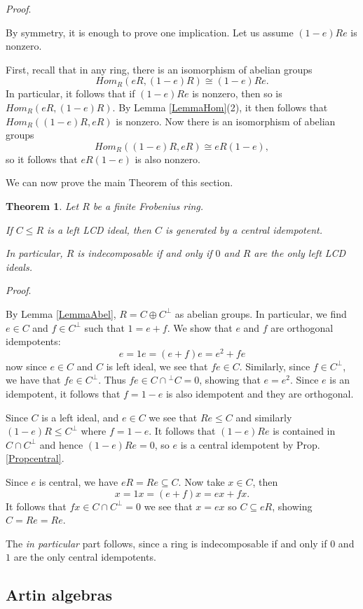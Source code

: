 \documentclass{article}
\theoremstyle{plain}
\newtheorem{Thm}[veta]{Theorem}
\theoremstyle{plain}
\theoremstyle{remark}
\theoremstyle{plain}
\newenvironment{dukaz}{
  \par\medskip \noindent
  \textit{Proof}.
}{

\rightline{$\qedsymbol$}
}
\begin{document}
\begin{dukaz}
    By symmetry, it is enough to prove one implication. Let us assume $(1-e)Re$ is nonzero.
    
    First, recall that in any ring,  there is an isomorphism of abelian groups   \[Hom_R(eR, (1-e)R)\cong (1-e)Re.\]
    In particular, it follows that if $(1-e)Re$ is nonzero, then so is $Hom_R(eR, (1-e)R)$. By Lemma \ref{LemmaHom}(2), it then follows that $Hom_R((1-e)R, eR)$ is nonzero. Now there is an isomorphism of abelian groups 
\[Hom_R((1-e)R, eR)\cong eR(1-e),\]
so it follows that $eR(1-e)$ is also nonzero. 
\end{dukaz}
We can now prove the main Theorem of this section.
\begin{Thm}\label{ThmLCDmain}
    Let $R$ be a finite Frobenius ring.

    If $C\leq R$ is a left LCD ideal, then $C$ is generated by a central idempotent.

 In particular,  $R$ is indecomposable if and only if $0$ and $R$ are the only left LCD ideals.
\end{Thm}
\begin{dukaz}
By Lemma \ref{LemmaAbel}, $R=C\oplus C^\perp$ as abelian groups. In particular, we find $e\in C$ and $f\in C^\perp$ such that $1=e+f$.  We show that $e$ and $f$ are orthogonal idempotents: \[e=1e=(e+f)e=e^2+fe\]
now since $e\in C$ and $C$ is left ideal, we see that $fe\in C$. Similarly, since $f\in C^\perp$, we have that $fe\in C^\perp$. Thus  $fe\in C\cap {}^\perp C=0$, showing that $e=e^2$. Since $e$ is an idempotent, it follows that $f=1-e$ is also idempotent and they are orthogonal.

Since $C$ is a left ideal, and $e\in C$ we see that $Re\leq C$ and similarly $(1-e)R\leq C^\perp$ where $f=1-e$. It follows that $(1-e)Re$ is contained in $C\cap C^\perp$ and hence $(1-e)Re=0$, so $e$ is a central idempotent by Prop. \ref{Propcentral}.

Since $e$ is central, we have $eR=Re\subseteq C$. Now take $x\in C$, then \[x=1x=(e+f)x=ex+fx.\] 
It follows that $fx\in C\cap C^\perp=0$ we see that $x=ex$ so $C\subseteq eR$, showing $C=Re=Re$.

The \textit{in particular} part follows, since a ring is indecomposable if and only if $0$ and $1$ are the only central idempotents.
\end{dukaz}

\subsection{Artin algebras}
\end{document}
